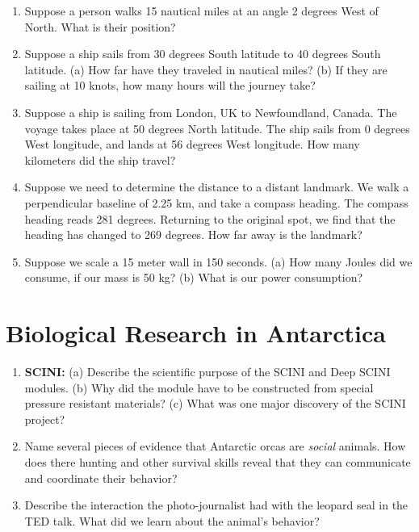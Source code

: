 \documentclass[10pt]{article}
\begin{document}
\begin{enumerate}
\item Suppose a person walks 15 nautical miles at an angle 2 degrees West of North.  What is their position? \\ \vspace{1cm}
\item Suppose a ship sails from 30 degrees South latitude to 40 degrees South latitude. (a) How far have they traveled in nautical miles? (b) If they are sailing at 10 knots, how many hours will the journey take?  \\ \vspace{1.5cm}
\item Suppose a ship is sailing from London, UK to Newfoundland, Canada.  The voyage takes place at 50 degrees North latitude.  The ship sails from 0 degrees West longitude, and lands at 56 degrees West longitude.  How many kilometers did the ship travel? \\ \vspace{1.5cm}
\item Suppose we need to determine the distance to a distant landmark.  We walk a perpendicular baseline of 2.25 km, and take a compass heading.  The compass heading reads 281 degrees.  Returning to the original spot, we find that the heading has changed to 269 degrees.  How far away is the landmark?  \\ \vspace{1.5cm}
\item Suppose we scale a 15 meter wall in 150 seconds.  (a) How many Joules did we consume, if our mass is 50 kg? (b) What is our power consumption? \\ \vspace{1cm}
\end{enumerate}

\section{Biological Research in Antarctica}

\begin{enumerate}
\item \textbf{SCINI:} (a) Describe the scientific purpose of the SCINI and Deep SCINI modules. (b) Why did the module have to be constructed from special pressure resistant materials? (c) What was one major discovery of the SCINI project? \\ \vspace{2cm}
\item Name several pieces of evidence that Antarctic orcas are \textit{social} animals.  How does there hunting and other survival skills reveal that they can communicate and coordinate their behavior?  \\ \vspace{2cm}
\item Describe the interaction the photo-journalist had with the leopard seal in the TED talk.  What did we learn about the animal's behavior?
\end{enumerate}
\end{document}
